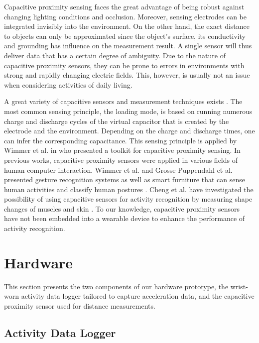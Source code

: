 \documentclass[runningheads,a4paper]{llncs}
\begin{document}
Capacitive proximity sensing faces the great advantage of being robust against changing lighting conditions and occlusion. Moreover, sensing electrodes can be integrated invisibly into the environment. On the other hand, the exact distance to objects can only be approximated since the object's surface, its conductivity and grounding has influence on the measurement result. A single sensor will thus deliver data that has a certain degree of ambiguity. Due to the nature of capacitive proximity sensors, they can be prone to errors in environments with strong and rapidly changing electric fields. This, however, is usually not an issue when considering activities of daily living. 

A great variety of capacitive sensors and measurement techniques exists \cite{Smith1999}. The most common sensing principle, the loading mode, is based on running numerous charge and discharge cycles of the virtual capacitor that is created by the electrode and the environment. Depending on the charge and discharge times, one can infer the corresponding capacitance. This sensing principle is applied by Wimmer et al. in \cite{Wimmer2007} who presented a toolkit for capacitive proximity sensing. In previous works, capacitive proximity sensors were applied in various fields of human-computer-interaction. Wimmer et al. and Grosse-Puppendahl et al. presented gesture recognition systems \cite{Wimmer,Grosse-puppendahl2012} as well as smart furniture that can sense human activities \cite{Wimmer} and classify human postures \cite{Grosse-puppendahl2011}. Cheng et al. have investigated the possibility of using capacitive sensors for activity recognition by measuring shape changes of muscles and skin \cite{Cheng2010}. 
To our knowledge, capacitive proximity sensors have not been embedded into a wearable device to enhance the performance of activity recognition.

\section{Hardware}
\label{sect:hardware}

This section presents the two components of our hardware prototype, the wrist-worn activity data logger tailored to capture acceleration data, and the capacitive proximity sensor used for distance measurements.

\subsection{Activity Data Logger}
\end{document}
